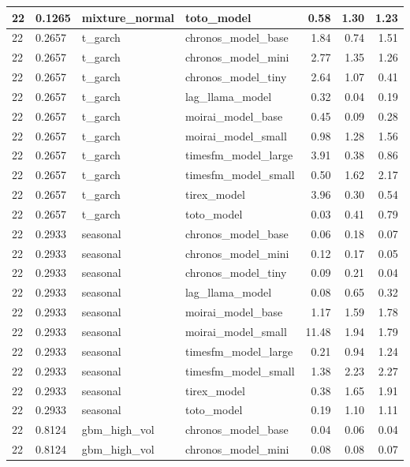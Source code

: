 {\begin{tabular}{llllrrr}
\midrule
22 & 0.1265 & mixture\_normal & toto\_model & 0.58 & 1.30 & 1.23 \\
\midrule
22 & 0.2657 & t\_garch & chronos\_model\_base & 1.84 & 0.74 & 1.51 \\
\midrule
22 & 0.2657 & t\_garch & chronos\_model\_mini & 2.77 & 1.35 & 1.26 \\
\midrule
22 & 0.2657 & t\_garch & chronos\_model\_tiny & 2.64 & 1.07 & 0.41 \\
\midrule
22 & 0.2657 & t\_garch & lag\_llama\_model & 0.32 & 0.04 & 0.19 \\
\midrule
22 & 0.2657 & t\_garch & moirai\_model\_base & 0.45 & 0.09 & 0.28 \\
\midrule
22 & 0.2657 & t\_garch & moirai\_model\_small & 0.98 & 1.28 & 1.56 \\
\midrule
22 & 0.2657 & t\_garch & timesfm\_model\_large & 3.91 & 0.38 & 0.86 \\
\midrule
22 & 0.2657 & t\_garch & timesfm\_model\_small & 0.50 & 1.62 & 2.17 \\
\midrule
22 & 0.2657 & t\_garch & tirex\_model & 3.96 & 0.30 & 0.54 \\
\midrule
22 & 0.2657 & t\_garch & toto\_model & 0.03 & 0.41 & 0.79 \\
\midrule
22 & 0.2933 & seasonal & chronos\_model\_base & 0.06 & 0.18 & 0.07 \\
\midrule
22 & 0.2933 & seasonal & chronos\_model\_mini & 0.12 & 0.17 & 0.05 \\
\midrule
22 & 0.2933 & seasonal & chronos\_model\_tiny & 0.09 & 0.21 & 0.04 \\
\midrule
22 & 0.2933 & seasonal & lag\_llama\_model & 0.08 & 0.65 & 0.32 \\
\midrule
22 & 0.2933 & seasonal & moirai\_model\_base & 1.17 & 1.59 & 1.78 \\
\midrule
22 & 0.2933 & seasonal & moirai\_model\_small & 11.48 & 1.94 & 1.79 \\
\midrule
22 & 0.2933 & seasonal & timesfm\_model\_large & 0.21 & 0.94 & 1.24 \\
\midrule
22 & 0.2933 & seasonal & timesfm\_model\_small & 1.38 & 2.23 & 2.27 \\
\midrule
22 & 0.2933 & seasonal & tirex\_model & 0.38 & 1.65 & 1.91 \\
\midrule
22 & 0.2933 & seasonal & toto\_model & 0.19 & 1.10 & 1.11 \\
\midrule
22 & 0.8124 & gbm\_high\_vol & chronos\_model\_base & 0.04 & 0.06 & 0.04 \\
\midrule
22 & 0.8124 & gbm\_high\_vol & chronos\_model\_mini & 0.08 & 0.08 & 0.07 \\

\end{tabular}}
